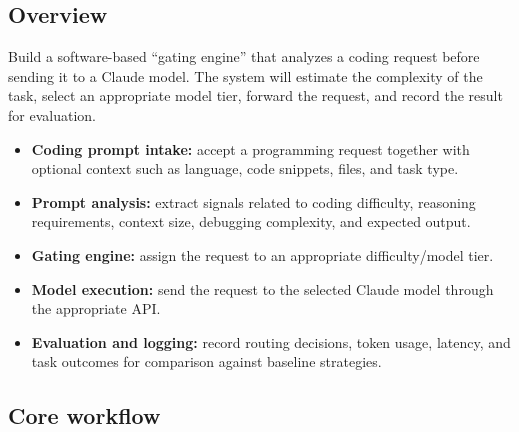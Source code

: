\documentclass[11pt,a4paper]{article}
\begin{document}
\subsection{Overview}

Build a software-based ``gating engine'' that analyzes a
coding request before sending it to a Claude model. The system
will estimate the complexity of the task, select an appropriate
model tier, forward the request, and record the result for
evaluation.

\begin{itemize}[leftmargin=0.7cm]

    \item \textbf{Coding prompt intake:} accept a programming
    request together with optional context such as language,
    code snippets, files, and task type.

    \item \textbf{Prompt analysis:} extract signals related
    to coding difficulty, reasoning requirements, context
    size, debugging complexity, and expected output.

    \item \textbf{Gating engine:} assign the request to an
    appropriate difficulty/model tier.

    \item \textbf{Model execution:} send the request to the
    selected Claude model through the appropriate API.

    \item \textbf{Evaluation and logging:} record routing
    decisions, token usage, latency, and task outcomes for
    comparison against baseline strategies.

\end{itemize}

\subsection{Core workflow}
\end{document}
